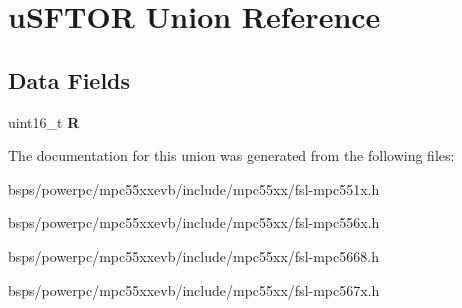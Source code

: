 \hypertarget{unionuSFTOR}{}\section{u\+S\+F\+T\+OR Union Reference}
\label{unionuSFTOR}
\subsection*{Data Fields}
\begin{DoxyCompactItemize}
\item 
\mbox{\label{unionuSFTOR_a81cc82f61c21efabc1cc1e50d75ffa60}} 
uint16\+\_\+t {\bfseries R}
\end{DoxyCompactItemize}


The documentation for this union was generated from the following files\+:\begin{DoxyCompactItemize}
\item 
bsps/powerpc/mpc55xxevb/include/mpc55xx/fsl-\/mpc551x.\+h\item 
bsps/powerpc/mpc55xxevb/include/mpc55xx/fsl-\/mpc556x.\+h\item 
bsps/powerpc/mpc55xxevb/include/mpc55xx/fsl-\/mpc5668.\+h\item 
bsps/powerpc/mpc55xxevb/include/mpc55xx/fsl-\/mpc567x.\+h\end{DoxyCompactItemize}
